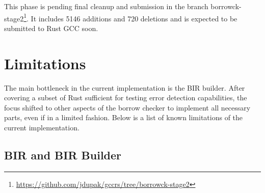 \documentclass[
  11pt,
  twoside,symmetric]{report}
\DeclareRobustCommand{\href}[2]{#2\footnote{\url{#1}}}
\begin{document}
This phase is pending final cleanup and submission in the branch
\href{https://github.com/jdupak/gccrs/tree/borrowck-stage2}{borrowck-stage2}.
It includes 5146 additions and 720 deletions and is expected to be
submitted to Rust GCC soon.

\section{Limitations}\label{sec:limitations}

The main bottleneck in the current implementation is the BIR builder.
After covering a subset of Rust sufficient for testing error detection
capabilities, the focus shifted to other aspects of the borrow checker
to implement all necessary parts, even if in a limited fashion. Below is
a list of known limitations of the current implementation.

\subsection{BIR and BIR Builder}\label{sec:bir-and-bir-builder}
\end{document}

